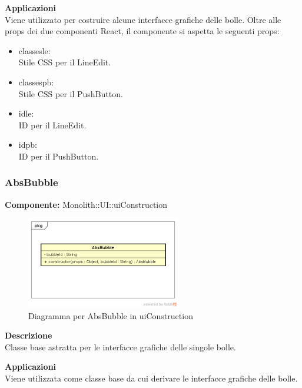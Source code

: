 \textbf{Applicazioni}\\
Viene utilizzato per costruire alcune interfacce grafiche delle bolle.
Oltre alle props dei due componenti React, il componente si aspetta le seguenti props:
\begin{itemize}

\item classesle:
\\
Stile CSS per il LineEdit.
\item classespb:
\\ 
Stile CSS per il PushButton.

\item idle:
\\
ID per il LineEdit.
\item idpb: 
\\
ID per il PushButton.
\end{itemize} 


\clearpage

\subsubsection{AbsBubble}
\textbf{Componente:}  Monolith::UI::uiConstruction\\
   \FloatBarrier
   \begin{figure}[ht]
   \centering
   \includegraphics[width=0.6\textwidth]{img/single-AbsBubble.png}
   \caption{{Diagramma per AbsBubble in uiConstruction}}
\end{figure}
\FloatBarrier
\textbf{Descrizione}\\
Classe base astratta per le interfacce grafiche delle singole bolle. 


\textbf{Applicazioni}\\
Viene utilizzata come classe base da cui derivare le interfacce grafiche delle bolle. 


\clearpage

